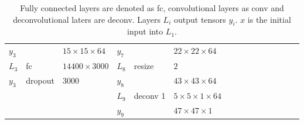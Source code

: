 \begin{landscape}
\begin{table}[h]
{\begin{tabular}{lllllllllllllll}
				\multicolumn{1}{|l|}{$y_3$}   &          & \multicolumn{1}{l|}{$15\times15\times64$}        & \multicolumn{1}{l|}{$y_7$}   &          & \multicolumn{1}{l|}{$22\times22\times64$}          &                              &                & \multicolumn{1}{l}{}                       &   &                             &   &                                           &                            &   \\ \cline{1-6}
				\multicolumn{1}{|l|}{$L_3$}   & fc       & \multicolumn{1}{l|}{$14400\times3000$}           & \multicolumn{1}{l|}{$L_8$}   & resize   & \multicolumn{1}{l|}{$2$}                           &                              &                & \multicolumn{1}{l}{}                       &   &                             &   &                                           &                            &   \\
				\multicolumn{1}{|l|}{$y_3$}   & dropout  & \multicolumn{1}{l|}{$3000$}                      & \multicolumn{1}{l|}{$y_8$}   &          & \multicolumn{1}{l|}{$43\times43\times64$}          &                              &                & \multicolumn{1}{l}{}                       &   &                             &   &                                           &                            &   \\ \cline{1-6}
				                              &          &                                                  & \multicolumn{1}{|l|}{$L_9$}  & deconv 1 & \multicolumn{1}{l|}{$5\times 5\times1\times 64$}   &                              &                & \multicolumn{1}{l}{}                       &   &                             &   &                                           &                            &   \\
				                              &          &                                                  & \multicolumn{1}{|l|}{$y_9$}  &          & \multicolumn{1}{l|}{$47\times47\times1$} &                              &                & \multicolumn{1}{l}{}                       &   &                             &   &                                           &                            &   \\ \cline{4-6}
			\end{tabular} }
			\caption{Fully connected layers are denoted as fc, convolutional layers as conv and deconvolutional laters are deconv. Layers $L_i$ output tensors $y_i$. $x$ is the initial input into $L_1$.}
      \label{tab:netIV}
	\end{table}



\end{landscape}
